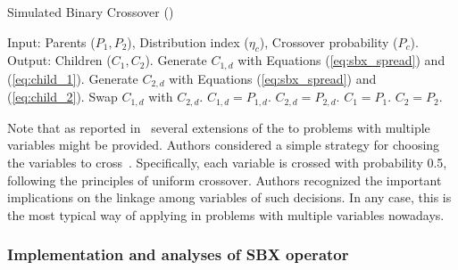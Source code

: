 \begin{algorithm}[t]
\scriptsize
\caption{Simulated Binary Crossover (\SBX{})}
\label{alg:SBX_Operator}
\begin{algorithmic}[1]
    \STATE Input: Parents ($P_{1}, P_{2}$), Distribution index ($\eta_c$), Crossover probability ($P_c$).
    \STATE Output: Children ($C_{1}, C_{2}$).
	 \label{alg:inherit_variable}
		\STATE Generate $C_{1,d}$ with Equations (\ref{eq:sbx_spread}) and (\ref{eq:child_1}).
		\STATE Generate $C_{2,d}$ with Equations (\ref{eq:sbx_spread}) and (\ref{eq:child_2}).
			\STATE Swap $C_{1,d}$ with $C_{2,d}$.
		 \ENDIF
        \ELSE
	   \STATE $C_{1,d} = P_{1, d}$.
	   \STATE $C_{2,d} = P_{2, d}$.
        \ENDIF
       \ENDFOR
    \ELSE
	\STATE $C_{1} = P_{1}$.
	\STATE $C_{2} = P_{2}$.
    \ENDIF
\end{algorithmic}
\end{algorithm}

Note that as reported in~\cite{Joel:SBX1994} several extensions of the \SBX{} to problems with multiple
variables might be provided.
%
Authors considered a simple strategy for choosing the variables to cross~\cite{Joel:UNDX}.
%
Specifically, each variable is crossed with probability 0.5, following the principles of uniform crossover.
%
Authors recognized the important implications on the linkage among variables of such decisions.
%
In any case, this is the most typical way of applying \SBX{} in problems with multiple variables nowadays.
%

\subsubsection{Implementation and analyses of SBX operator}

